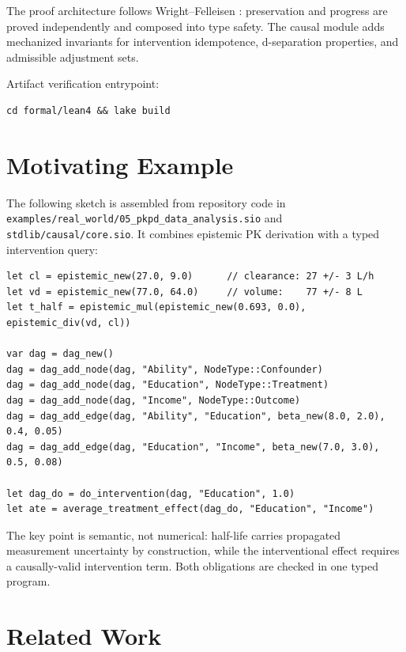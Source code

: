 \documentclass[acmsmall,screen,review,anonymous]{acmart}
\begin{document}
The proof architecture follows Wright--Felleisen
\cite{wright1994type}: preservation and progress are proved
independently and composed into type safety.
The causal module adds mechanized invariants for intervention
idempotence, d-separation properties, and admissible adjustment sets.

Artifact verification entrypoint:
\begin{verbatim}
cd formal/lean4 && lake build
\end{verbatim}

\section{Motivating Example}
\label{sec:example}

The following sketch is assembled from repository code in
\texttt{examples/real\_world/05\_pkpd\_data\_analysis.sio} and
\texttt{stdlib/causal/core.sio}.
It combines epistemic PK derivation with a typed intervention query:

\begin{lstlisting}[caption={Causal-epistemic pharmacokinetic sketch from repository sources}]
let cl = epistemic_new(27.0, 9.0)      // clearance: 27 +/- 3 L/h
let vd = epistemic_new(77.0, 64.0)     // volume:    77 +/- 8 L
let t_half = epistemic_mul(epistemic_new(0.693, 0.0), epistemic_div(vd, cl))

var dag = dag_new()
dag = dag_add_node(dag, "Ability", NodeType::Confounder)
dag = dag_add_node(dag, "Education", NodeType::Treatment)
dag = dag_add_node(dag, "Income", NodeType::Outcome)
dag = dag_add_edge(dag, "Ability", "Education", beta_new(8.0, 2.0), 0.4, 0.05)
dag = dag_add_edge(dag, "Education", "Income", beta_new(7.0, 3.0), 0.5, 0.08)

let dag_do = do_intervention(dag, "Education", 1.0)
let ate = average_treatment_effect(dag_do, "Education", "Income")
\end{lstlisting}

The key point is semantic, not numerical: half-life carries propagated
measurement uncertainty by construction, while the interventional effect
requires a causally-valid intervention term.
Both obligations are checked in one typed program.

\section{Related Work}
\label{sec:related}
\end{document}
